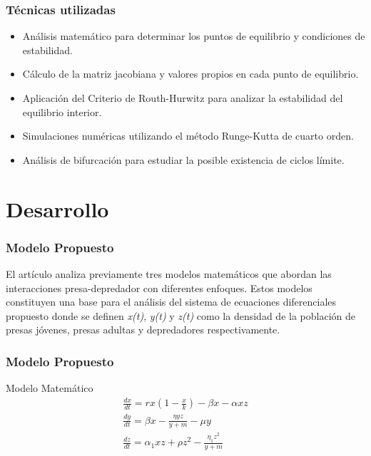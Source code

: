 \documentclass{beamer}
\begin{document}
\begin{frame}
	\frametitle{T\'ecnicas utilizadas}
	\begin{minipage}{10cm}
		\begin{itemize}
			\item Análisis matemático para determinar los puntos de equilibrio y condiciones de estabilidad.
			\item Cálculo de la matriz jacobiana y valores propios en cada punto de equilibrio.
			\item Aplicación del Criterio de Routh-Hurwitz
			para analizar la estabilidad del equilibrio interior.
			\item Simulaciones numéricas utilizando el método Runge-Kutta de
			cuarto orden.
			\item Análisis de bifurcación para estudiar la posible existencia de ciclos límite.
		\end{itemize} 
	\end{minipage}
\end{frame}	

\section{Desarrollo}
\begin{frame}
\frametitle{Modelo Propuesto}
\begin{minipage}{10cm}
	El artículo analiza previamente tres modelos matemáticos que abordan las interacciones presa-depredador con diferentes enfoques. Estos modelos constituyen una base para el análisis 
	del sistema de ecuaciones diferenciales propuesto donde se definen \emph{x(t)}, \emph{y(t)} y \emph{z(t)} como la densidad de la poblaci\'on de presas j\'ovenes, presas adultas y depredadores respectivamente.
	
\end{minipage}
\end{frame}

\begin{frame}
	\frametitle{Modelo Propuesto}
	\begin{minipage}{10cm}
\begin{block}{Modelo Matem\'atico}
	\begin{equation} \label{twoPreyonePredatorEDO}
	\begin{gathered}
	\frac{d x}{d t}=r x\left(1-\frac{x}{k}\right)-\beta x-\alpha x z \\
	\frac{d y}{d t}=\beta x-\frac{\eta y z}{y+m}-\mu y \\
	\frac{d z}{d t}=\alpha_1 x z + \rho z^2-\frac{\eta_1 z^2}{y+m}
	\end{gathered}
	\end{equation}
\end{block}	
		
	\end{minipage}
\end{frame}
\end{document}
